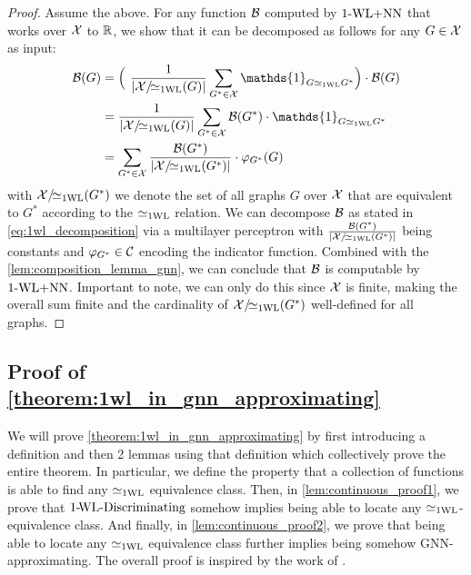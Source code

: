 \begin{proof}
    Assume the above. For any function $\mathcal{B}$ computed by $\text{1-WL+NN}$ that works over $\mathcal{X}$ to $\mathbb{R}$, we show that it can be decomposed as follows for any $G \in \mathcal{X}$ as input:
    \begin{align}\label{eq:1wl_decomposition}
        \cB(G) &= \Bigl( \ \frac{1}{|\cX/\!{\wliso}(G)|}\sum_{G^* \in \cX} \mathds{1}_{G \wliso G^*} \Bigr) \cdot \cB(G) \nonumber \\
        &= \frac{1}{|\cX/\!{\wliso}(G)|}\sum_{G^* \in \cX} \cB(G^*) \cdot \mathds{1}_{G \wliso G^*} \nonumber \\
        &= \sum_{G^* \in \cX} \frac{\cB(G^*)}{|\cX/\!{\wliso}(G^*)|}  \cdot \varphi_{G^*}(G)
    \end{align}
    with $\mathcal{X}/\!{\simeq_{\text{1WL}}}(G^*)$ we denote the set of all graphs $G$ over $\mathcal{X}$ that are equivalent to $G^*$ according to the $\simeq_{\text{1WL}}$ relation. We can decompose $\mathcal{B}$ as stated in \autoref{eq:1wl_decomposition} via a multilayer perceptron with $\frac{\mathcal{B}(G^*)}{|\mathcal{X}/\!{\simeq_{\text{1WL}}}(G^*)|}$ being constants and $\varphi_{G^*} \in \mathcal{C}$ encoding the indicator function. Combined with the \autoref{lem:composition_lemma_gnn}, we can conclude that $\mathcal{B}$ is computable by $\text{1-WL+NN}$. Important to note, we can only do this since $\mathcal{X}$ is finite, making the overall sum finite and the cardinality of $\mathcal{X}/\!{\simeq_{\text{1WL}}}(G^*)$ well-defined for all graphs.
\end{proof}






\subsection{Proof of \autoref{theorem:1wl_in_gnn_approximating}}
We will prove \autoref{theorem:1wl_in_gnn_approximating} by first introducing a definition and then 2 lemmas using that definition which collectively prove the entire theorem. In particular, we define the property that a collection of functions is able to find any $\simeq_{\text{1WL}}$ equivalence class. Then, in \autoref{lem:continuous_proof1}, we prove that $\text{1-\!WL-Discriminating}$ somehow implies being able to locate any $\simeq_{\text{1WL}}$-equivalence class. And finally, in \autoref{lem:continuous_proof2}, we prove that being able to locate any $\simeq_{\text{1WL}}$ equivalence class further implies being somehow GNN-approximating. The overall proof is inspired by the work of \cite{Chen2019}.

